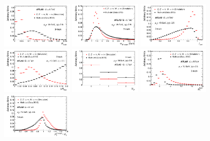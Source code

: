 \begin{figure}[tp]
  \centering
  \includegraphics[width=0.32\textwidth]{figures/PERF-2013-06/fig_03a}
  \includegraphics[width=0.32\textwidth]{figures/PERF-2013-06/fig_03b}
  \includegraphics[width=0.32\textwidth]{figures/PERF-2013-06/figaux_07}
  \includegraphics[width=0.32\textwidth]{figures/PERF-2013-06/figaux_08}
  \includegraphics[width=0.32\textwidth]{figures/PERF-2013-06/figaux_09}
  \includegraphics[width=0.32\textwidth]{figures/PERF-2013-06/figaux_10}
  \includegraphics[width=0.32\textwidth]{figures/PERF-2013-06/figaux_11}

\end{figure}
